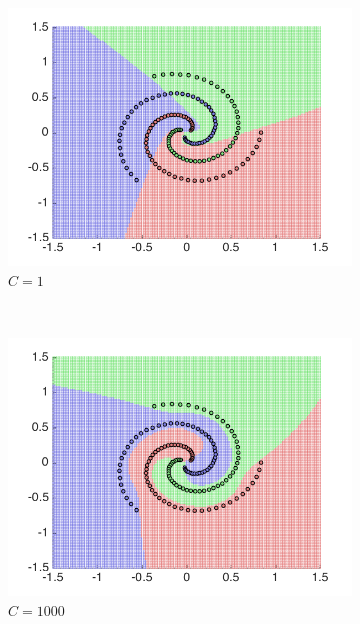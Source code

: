 \documentclass[10pt,twocolumn,letterpaper]{article}
\begin{document}
\begin{figure}
	\begin{subfigure}[H]{0.3 \columnwidth}
		\includegraphics[width = 1\columnwidth]{q2_ovr_C1}\hfill
		\caption{$C = 1$}
	\end{subfigure}
	~
	\begin{subfigure}[H]{0.3 \columnwidth}
		\includegraphics[width = 1\columnwidth]{q2_ovr_C1000}
		\caption{$C = 1000$}
	\end{subfigure}
	~
	\begin{subfigure}[H]{0.3 \columnwidth}

\end{subfigure}
\end{figure}
\end{document}
